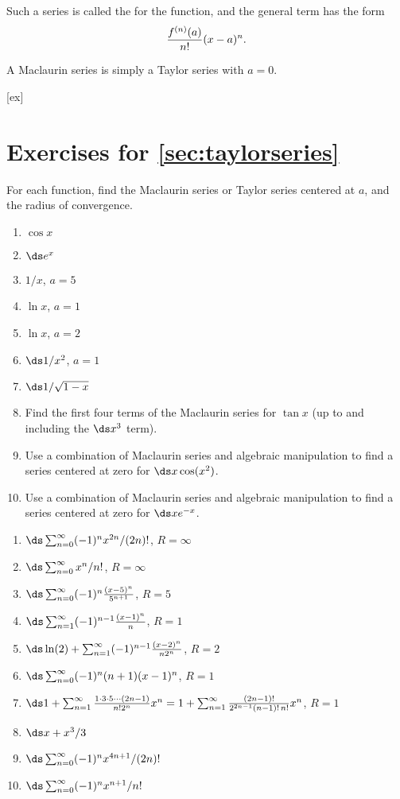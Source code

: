 Such a series is called the 
 for the function,
and the general term has the form
\[{f^{(n)}(a)\over n!}(x-a)^n.\]

A Maclaurin series is simply a Taylor series with $a=0$.

[ex]
\section*{Exercises for \ref{sec:taylorseries}}

\begin{enumialphparenastyle}

\begin{ex}
For each function, find the Maclaurin series or Taylor series centered
at $a$, and the radius of convergence.

\begin{enumerate}
	\item $\cos x$
	\item $\ds e^x$
	\item $1/x$, $a=5$
	\item $\ln x$, $a=1$
	\item $\ln x$, $a=2$
	\item $\ds 1/x^2$, $a=1$
	\item $\ds 1/\sqrt{1-x}$
	\item Find the first four terms of the Maclaurin series for $\tan
	x$ (up to and including the $\ds x^3$ term).
	\item Use a combination of Maclaurin series and algebraic
	manipulation to find a series centered at zero for
	$\ds x\cos (x^2)$.
	\item Use a combination of Maclaurin series and algebraic
	manipulation to find a series centered at zero for
	$\ds xe^{-x}$.
\end{enumerate}
\begin{sol}
\begin{enumerate}
	\item $\ds\sum_{n=0}^\infty (-1)^n x^{2n}/(2n)!$, $R=\infty$
	\item $\ds\sum_{n=0}^\infty x^n/n!$, $R=\infty$
	\item $\ds\sum_{n=0}^\infty (-1)^n{(x-5)^n\over 5^{n+1}}$, $R=5$
	\item $\ds\sum_{n=1}^\infty (-1)^{n-1}{(x-1)^n\over n}$, $R=1$
	\item $\ds\ln(2)+\sum_{n=1}^\infty (-1)^{n-1}{(x-2)^n\over n 2^n}$, $R=2$
	\item $\ds\sum_{n=0}^\infty (-1)^n(n+1)(x-1)^n$, $R=1$
	\item $\ds1+\sum_{n=1}^\infty {1\cdot3\cdot5\cdots(2n-1)\over
		n!2^n} x^n=1+\sum_{n=1}^\infty {(2n-1)!\over 2^{2n-1}(n-1)!\,n!}x^n$, $R=1$
	\item $\ds x+x^3/3$
	\item $\ds\sum_{n=0}^\infty (-1)^n x^{4n+1}/(2n)!$
	\item $\ds\sum_{n=0}^\infty (-1)^n x^{n+1}/n!$
\end{enumerate}
\end{sol}
\end{ex}

\end{enumialphparenastyle}